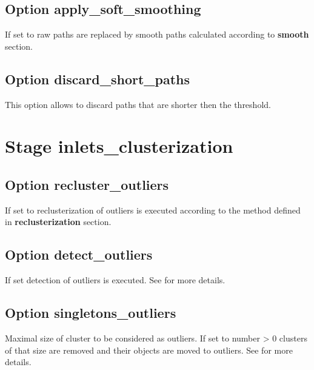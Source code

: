 \documentclass[a4paper,10pt,english]{sphinxmanual}
\begin{document}
\subsection{Option \textbf{apply\_soft\_smoothing}}
\label{valve/valve_config:option-apply-soft-smoothing}
If set to  raw paths are replaced by smooth paths calculated according to \textbf{smooth} section.


\subsection{Option \textbf{discard\_short\_paths}}
\label{valve/valve_config:option-discard-short-paths}
This option allows to discard paths that are shorter then the threshold.


\section{Stage \textbf{inlets\_clusterization}}
\label{valve/valve_config:stage-inlets-clusterization}

\subsection{Option \textbf{recluster\_outliers}}
\label{valve/valve_config:option-recluster-outliers}
If set to  reclusterization of outliers is executed according to the method defined in \textbf{reclusterization} section.


\subsection{Option \textbf{detect\_outliers}}
\label{valve/valve_config:option-detect-outliers}
If set detection of outliers is executed. See {\hyperref[valve/valve_manual:clusterization\string-of\string-inlets]{}} for more details.


\subsection{Option \textbf{singletons\_outliers}}
\label{valve/valve_config:option-singletons-outliers}
Maximal size of cluster to be considered as outliers. If set to number \textgreater{} 0 clusters of that size are removed and their objects are moved to outliers. See {\hyperref[valve/valve_manual:clusterization\string-of\string-inlets]{}} for more details.
\end{document}

